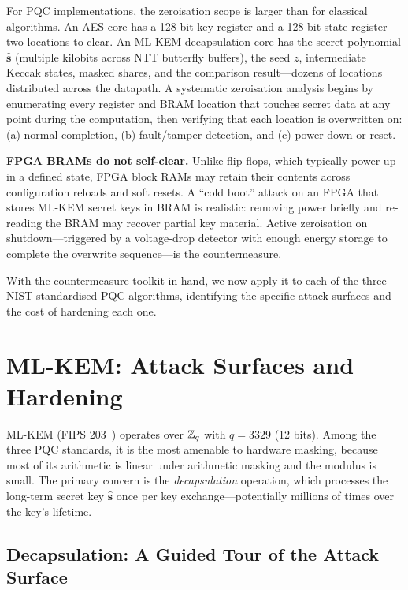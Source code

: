 For PQC implementations, the zeroisation scope is larger than for classical algorithms.  An AES core has a 128-bit key register and a 128-bit state register---two locations to clear.  An ML-KEM decapsulation core has the secret polynomial $\hat{\mathbf{s}}$ (multiple kilobits across NTT butterfly buffers), the seed $z$, intermediate Keccak states, masked shares, and the comparison result---dozens of locations distributed across the datapath.  A systematic zeroisation analysis begins by enumerating every register and BRAM location that touches secret data at any point during the computation, then verifying that each location is overwritten on: (a) normal completion, (b) fault/tamper detection, and (c) power-down or reset.

\begin{svgraybox}
\textbf{FPGA BRAMs do not self-clear.}  Unlike flip-flops, which typically power up in a defined state, FPGA block RAMs may retain their contents across configuration reloads and soft resets.  A ``cold boot'' attack on an FPGA that stores ML-KEM secret keys in BRAM is realistic: removing power briefly and re-reading the BRAM may recover partial key material.  Active zeroisation on shutdown---triggered by a voltage-drop detector with enough energy storage to complete the overwrite sequence---is the countermeasure.
\end{svgraybox}

With the countermeasure toolkit in hand, we now apply it to each of the three NIST-standardised PQC algorithms, identifying the specific attack surfaces and the cost of hardening each one.


\section{ML-KEM: Attack Surfaces and Hardening}
\label{sec:mlkem-hardening}

ML-KEM (FIPS 203~\cite{FIPS203}) operates over $\mathbb{Z}_q$ with $q = 3329$ (12 bits).  Among the three PQC standards, it is the most amenable to hardware masking, because most of its arithmetic is linear under arithmetic masking and the modulus is small.  The primary concern is the \emph{decapsulation} operation, which processes the long-term secret key $\hat{\mathbf{s}}$ once per key exchange---potentially millions of times over the key's lifetime.

\subsection{Decapsulation: A Guided Tour of the Attack Surface}
\label{subsec:mlkem-decaps}

